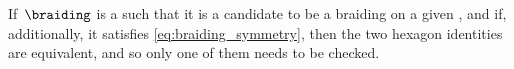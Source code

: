 \begin{remark}
    If~$\braiding$ is a  such that it is a candidate to be a braiding on a given , and if, additionally, it satisfies \cref{eq:braiding_symmetry}, then the two hexagon identities are equivalent, and so only one of them needs to be checked.
\end{remark}
